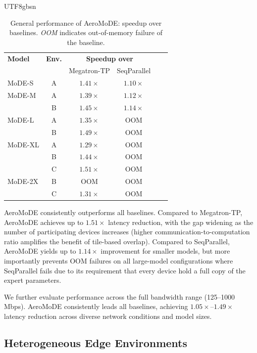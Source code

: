 \documentclass[conference]{IEEEtran}
\begin{document}
\begin{CJK*}{UTF8}{gbsn}
\begin{table}[t]
  \caption{General performance of AeroMoDE: speedup over baselines.
           \textit{OOM} indicates out-of-memory failure of the baseline.}
  \label{tab:main_results}
  \centering
  \renewcommand{\arraystretch}{1.2}
  \begin{tabular}{lccccl}
    \toprule
    \textbf{Model} & \textbf{Env.} &
    \multicolumn{2}{c}{\textbf{Speedup over}} \\
    & & Megatron-TP & SeqParallel \\
    \midrule
    MoDE-S  & A & $1.41\times$ & $1.10\times$ \\
    MoDE-M  & A & $1.39\times$ & $1.12\times$ \\
            & B & $1.45\times$ & $1.14\times$ \\
    MoDE-L  & A & $1.35\times$ & OOM \\
            & B & $1.49\times$ & OOM \\
    MoDE-XL & A & $1.29\times$ & OOM \\
            & B & $1.44\times$ & OOM \\
            & C & $1.51\times$ & OOM \\
    MoDE-2X & B & OOM          & OOM \\
            & C & $1.31\times$ & OOM \\
    \bottomrule
  \end{tabular}
\end{table}

AeroMoDE consistently outperforms all baselines.  Compared to
Megatron-TP, AeroMoDE achieves up to $1.51\times$ latency reduction,
with the gap widening as the number of participating devices
increases (higher communication-to-computation ratio amplifies the
benefit of tile-based overlap).  Compared to SeqParallel, AeroMoDE
yields up to $1.14\times$ improvement for smaller models, but more
importantly prevents OOM failures on all large-model configurations
where SeqParallel fails due to its requirement that every device
hold a full copy of the expert parameters.

We further evaluate performance across the full bandwidth range
(125--1000\,Mbps).  AeroMoDE consistently leads all baselines,
achieving $1.05\times$--$1.49\times$ latency reduction across
diverse network conditions and model sizes.

\subsection{Heterogeneous Edge Environments}
\label{sec:hetero}


\end{CJK*}
\end{document}
